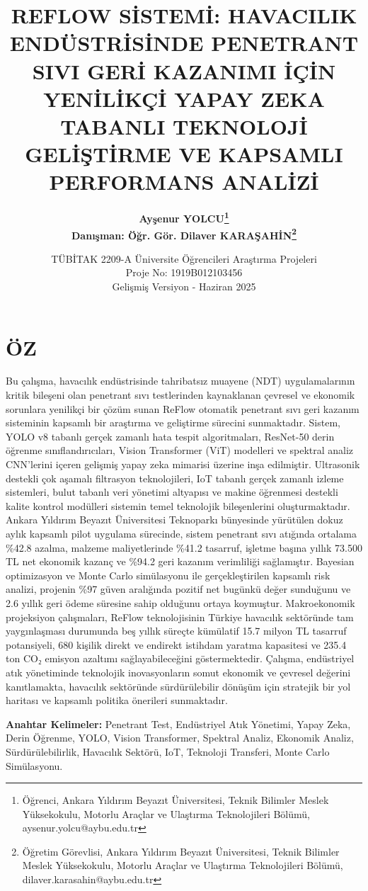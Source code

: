 \documentclass[12pt,a4paper]{article}
\title{\fontsize{16}{19}\selectfont\bfseries\MakeUppercase{REFLOW SİSTEMİ: HAVACILIK ENDÜSTRİSİNDE PENETRANT SIVI GERİ KAZANIMI İÇİN YENİLİKÇİ YAPay ZEKA TABANLI TEKNOLOJİ GELİŞTİRME VE KAPSAMLI PERFORMANS ANALİZİ}}
\author{\fontsize{13}{15}\selectfont\bfseries Ayşenur YOLCU\footnote{Öğrenci, Ankara Yıldırım Beyazıt Üniversitesi, Teknik Bilimler Meslek Yüksekokulu, Motorlu Araçlar ve Ulaştırma Teknolojileri Bölümü, aysenur.yolcu@aybu.edu.tr}\\[0.5cm]
\fontsize{13}{15}\selectfont Danışman: Öğr. Gör. Dilaver KARAŞAHİN\footnote{Öğretim Görevlisi, Ankara Yıldırım Beyazıt Üniversitesi, Teknik Bilimler Meslek Yüksekokulu, Motorlu Araçlar ve Ulaştırma Teknolojileri Bölümü, dilaver.karasahin@aybu.edu.tr}}
\date{TÜBİTAK 2209-A Üniversite Öğrencileri Araştırma Projeleri\\
Proje No: 1919B012103456\\
Gelişmiş Versiyon - Haziran 2025}
\begin{document}
\maketitle

\section*{\bfseries ÖZ}

Bu çalışma, havacılık endüstrisinde tahribatsız muayene (NDT) uygulamalarının kritik bileşeni olan penetrant sıvı testlerinden kaynaklanan çevresel ve ekonomik sorunlara yenilikçi bir çözüm sunan ReFlow otomatik penetrant sıvı geri kazanım sisteminin kapsamlı bir araştırma ve geliştirme sürecini sunmaktadır. Sistem, YOLO v8 tabanlı gerçek zamanlı hata tespit algoritmaları, ResNet-50 derin öğrenme sınıflandırıcıları, Vision Transformer (ViT) modelleri ve spektral analiz CNN'lerini içeren gelişmiş yapay zeka mimarisi üzerine inşa edilmiştir. Ultrasonik destekli çok aşamalı filtrasyon teknolojileri, IoT tabanlı gerçek zamanlı izleme sistemleri, bulut tabanlı veri yönetimi altyapısı ve makine öğrenmesi destekli kalite kontrol modülleri sistemin temel teknolojik bileşenlerini oluşturmaktadır. Ankara Yıldırım Beyazıt Üniversitesi Teknoparkı bünyesinde yürütülen dokuz aylık kapsamlı pilot uygulama sürecinde, sistem penetrant sıvı atığında ortalama \%42.8 azalma, malzeme maliyetlerinde \%41.2 tasarruf, işletme başına yıllık 73.500 TL net ekonomik kazanç ve \%94.2 geri kazanım verimliliği sağlamıştır. Bayesian optimizasyon ve Monte Carlo simülasyonu ile gerçekleştirilen kapsamlı risk analizi, projenin \%97 güven aralığında pozitif net bugünkü değer sunduğunu ve 2.6 yıllık geri ödeme süresine sahip olduğunu ortaya koymuştur. Makroekonomik projeksiyon çalışmaları, ReFlow teknolojisinin Türkiye havacılık sektöründe tam yaygınlaşması durumunda beş yıllık süreçte kümülatif 15.7 milyon TL tasarruf potansiyeli, 680 kişilik direkt ve endirekt istihdam yaratma kapasitesi ve 235.4 ton CO₂ emisyon azaltımı sağlayabileceğini göstermektedir. Çalışma, endüstriyel atık yönetiminde teknolojik inovasyonların somut ekonomik ve çevresel değerini kanıtlamakta, havacılık sektöründe sürdürülebilir dönüşüm için stratejik bir yol haritası ve kapsamlı politika önerileri sunmaktadır.

\textbf{Anahtar Kelimeler:} Penetrant Test, Endüstriyel Atık Yönetimi, Yapay Zeka, Derin Öğrenme, YOLO, Vision Transformer, Spektral Analiz, Ekonomik Analiz, Sürdürülebilirlik, Havacılık Sektörü, IoT, Teknoloji Transferi, Monte Carlo Simülasyonu.
\end{document}
